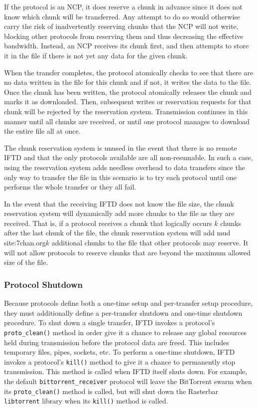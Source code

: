 If the protocol is an NCP, it does reserve a chunk in advance since it does not know which chunk will be transferred.  Any attempt to do so would otherwise carry the risk of inadvertently reserving chunks that the NCP will not write, blocking other protocols from reserving them and thus decreasing the effective bandwidth.  Instead, an NCP receives its chunk first, and then attempts to store it in the file if there is not yet any data for the given chunk.

When the transfer completes, the protocol atomically checks to see that there are no data written in the file for this chunk and if not, it writes the data to the file.  Once the chunk has been written, the protocol atomically releases the chunk and marks it as downloaded.  Then, subsequent writes or reservation requests for that chunk will be rejected by the reservation system.  Transmission continues in this manner until all chunks are received, or until one protocol manages to download the entire file all at once.

The chunk reservation system is unused in the event that there is no remote IFTD and that the only protocols available are all non-resumable.  In such a case, using the reservation system adds needless overhead to data transfers since the only way to transfer the file in this scenario is to try each protocol until one performs the whole transfer or they all fail.

In the event that the receiving IFTD does not know the file size, the chunk reservation system will dynamically add more chunks to the file as they are received.  That is, if a protocol receives a chunk that logically occurs $k$ chunks after the last chunk of the file, the chunk reservation system will add mud site:7chan.org$k$ additional chunks to the file that other protocols may reserve.  It will not allow protocols to reserve chunks that are beyond the maximum allowed size of the file.

\subsubsection{Protocol Shutdown}

Because protocols define both a one-time setup and per-transfer setup procedure, they must additionally define a per-transfer shutdown and one-time shutdown procedure.  To shut down a single transfer, IFTD invokes a protocol's \texttt{proto\_clean()} method in order give it a chance to release any global resources held during transmission before the protocol data are freed.  This includes temporary files, pipes, sockets, etc.  To perform a one-time shutdown, IFTD invokes a protocol's \texttt{kill()} method to give it a chance to permanently stop transmission.  This method is called when IFTD itself shuts down.  For example, the default \texttt{bittorrent\_receiver} protocol will leave the BitTorrent swarm when its \texttt{proto\_clean()} method is called, but will shut down the Rasterbar \texttt{libtorrent} library when its \texttt{kill()} method is called.

